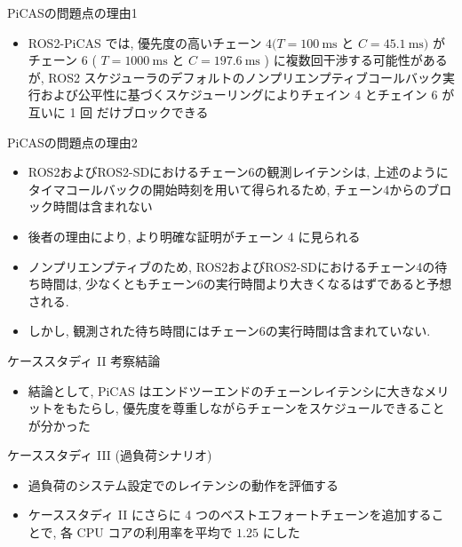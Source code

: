 \begin{frame}{PiCASの問題点の理由1}
    \begin{itemize}
        \item ROS2-PiCAS では, 優先度の高いチェーン $4(T=100 \mathrm{~ms}$ と $C=45.1 \mathrm{~ms})$ がチェーン 6 ( $T=1000 \mathrm{~ms}$ と $C=197.6 \mathrm{~ms}$ ) に複数回干渉する可能性があるが, ROS2 スケジューラのデフォルトのノンプリエンプティブコールバック実行および公平性に基づくスケジューリングによりチェイン 4 とチェイン 6 が互いに 1 回 だけブロックできる
    \end{itemize}
\end{frame}

\begin{frame}{PiCASの問題点の理由2}
    \begin{itemize}
        \item ROS2およびROS2-SDにおけるチェーン6の観測レイテンシは, 上述のようにタイマコールバックの開始時刻を用いて得られるため, チェーン4からのブロック時間は含まれない
        \item 後者の理由により, より明確な証明がチェーン 4 に見られる
        \item ノンプリエンプティブのため, ROS2およびROS2-SDにおけるチェーン4の待ち時間は, 少なくともチェーン6の実行時間より大きくなるはずであると予想される.
        \item しかし, 観測された待ち時間にはチェーン6の実行時間は含まれていない.
    \end{itemize}
\end{frame}

\begin{frame}{ケーススタディ II 考察結論}
    \begin{itemize}
        \item 結論として, PiCAS はエンドツーエンドのチェーンレイテンシに大きなメリットをもたらし, 優先度を尊重しながらチェーンをスケジュールできることが分かった
    \end{itemize}
\end{frame}


\begin{frame}{ケーススタディ III (過負荷シナリオ)}
    \begin{itemize}
        \item 過負荷のシステム設定でのレイテンシの動作を評価する
        \item ケーススタディ II にさらに 4 つのベストエフォートチェーンを追加することで, 各 CPU コアの利用率を平均で $1.25$ にした
    \end{itemize}
\end{frame}

